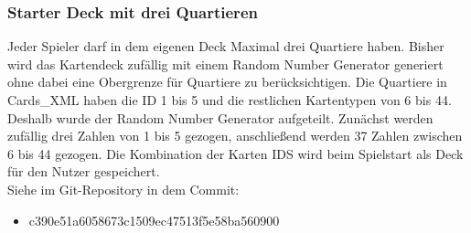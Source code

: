\subsubsection{Starter Deck mit drei Quartieren}
Jeder Spieler darf in dem eigenen Deck Maximal drei Quartiere haben. Bisher wird das Kartendeck zufällig mit einem Random Number Generator generiert ohne dabei eine Obergrenze für Quartiere zu berücksichtigen. Die Quartiere in Cards\_XML haben die ID 1 bis 5 und die restlichen Kartentypen von 6 bis 44. Deshalb wurde der Random Number Generator aufgeteilt. Zunächst werden zufällig drei Zahlen von 1 bis 5 gezogen, anschließend werden 37 Zahlen zwischen 6 bis 44 gezogen. Die Kombination der Karten IDS wird beim Spielstart als Deck für den Nutzer gespeichert. \\
Siehe im Git-Repository in dem Commit:
\begin{itemize}
\item c390e51a6058673c1509ec47513f5e58ba560900
\end{itemize}

